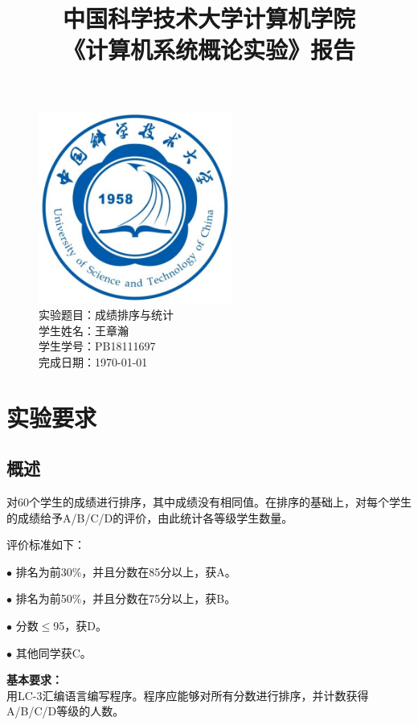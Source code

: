 \documentclass[UTF8]{article}
\title{中国科学技术大学计算机学院\\《计算机系统概论实验》报告}
\author{}
\date{}
\begin{document}
\maketitle
	\begin{figure}[H]
		\centering
		\includegraphics[width=2.5in]{xiaohui.jpg}\vspace{0.5cm}\\
		\large{
			实验题目：成绩排序与统计\\
			学生姓名：王章瀚\\
			学生学号：PB18111697\\
			完成日期：\today\\
		}\vspace{2cm}
		
		\thispagestyle{empty}
		\clearpage  %
	\end{figure}
	\newpage
	
	\section{实验要求}
	\subsection{概述}
	对60个学生的成绩进行排序，其中成绩没有相同值。在排序的基础上，对每个学生的成绩给予A/B/C/D的评价，由此统计各等级学生数量。\par
	评价标准如下：\par
	$\bullet$ 排名为前30\%，并且分数在85分以上，获A。\par
	$\bullet$ 排名为前50\%，并且分数在75分以上，获B。\par
	$\bullet$ 分数$\leq$95，获D。\par
	$\bullet$ 其他同学获C。\par
	\textbf{基本要求：}\\
	用LC-3汇编语言编写程序。程序应能够对所有分数进行排序，并计数获得A/B/C/D等级的人数。
	
\end{document}
